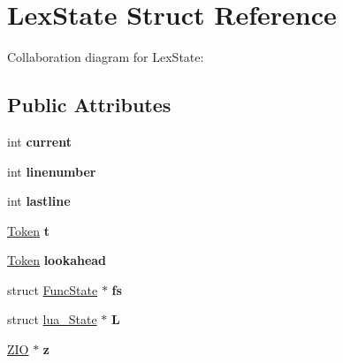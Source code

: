 \hypertarget{struct_lex_state}{\section{Lex\+State Struct Reference}
\label{struct_lex_state}
}


Collaboration diagram for Lex\+State\+:
\subsection*{Public Attributes}
\begin{DoxyCompactItemize}
\item 
\hypertarget{struct_lex_state_ad31cc4568332a48d22d37a13c8eae006}{int {\bfseries current}}\label{struct_lex_state_ad31cc4568332a48d22d37a13c8eae006}

\item 
\hypertarget{struct_lex_state_a9047632ca93c760b66b6303c819099d5}{int {\bfseries linenumber}}\label{struct_lex_state_a9047632ca93c760b66b6303c819099d5}

\item 
\hypertarget{struct_lex_state_aaadb237d4fc6b81d2242e666de885bf7}{int {\bfseries lastline}}\label{struct_lex_state_aaadb237d4fc6b81d2242e666de885bf7}

\item 
\hypertarget{struct_lex_state_a597c734626136f4ddb8232e8fc3abfc4}{\hyperlink{struct_token}{Token} {\bfseries t}}\label{struct_lex_state_a597c734626136f4ddb8232e8fc3abfc4}

\item 
\hypertarget{struct_lex_state_ad3c75c11dbbdae006057cb4b847a4f91}{\hyperlink{struct_token}{Token} {\bfseries lookahead}}\label{struct_lex_state_ad3c75c11dbbdae006057cb4b847a4f91}

\item 
\hypertarget{struct_lex_state_a01999e4f68cc6a3bd0b9eb6ebd241f7b}{struct \hyperlink{struct_func_state}{Func\+State} $\ast$ {\bfseries fs}}\label{struct_lex_state_a01999e4f68cc6a3bd0b9eb6ebd241f7b}

\item 
\hypertarget{struct_lex_state_af1ffd91f6684eee85e707a4b9927019b}{struct \hyperlink{structlua___state}{lua\+\_\+\+State} $\ast$ {\bfseries L}}\label{struct_lex_state_af1ffd91f6684eee85e707a4b9927019b}

\item 
\hypertarget{struct_lex_state_a591ffaffa1f3c21653904dccf81a4377}{\hyperlink{struct_zio}{Z\+I\+O} $\ast$ {\bfseries z}}\label{struct_lex_state_a591ffaffa1f3c21653904dccf81a4377}


\end{DoxyCompactItemize}
